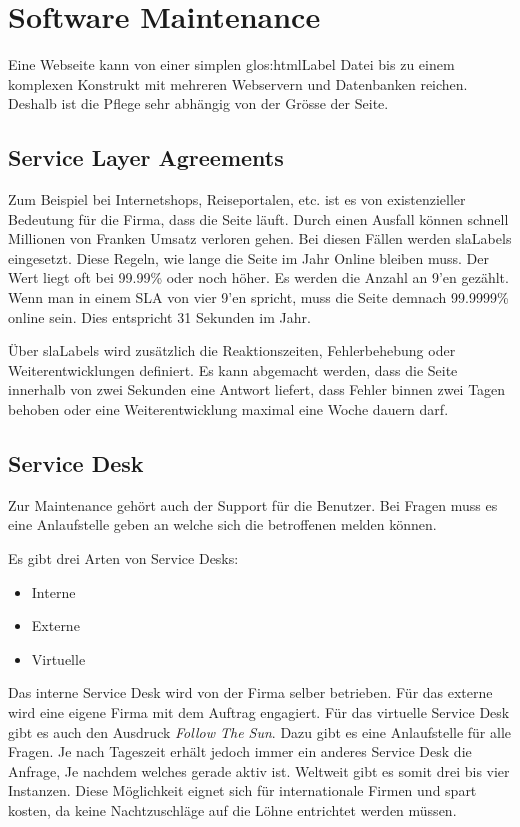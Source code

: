 \chapter{Software Maintenance}
Eine Webseite kann von einer simplen \Gls{glos:htmlLabel} Datei bis zu einem komplexen Konstrukt mit mehreren Webservern und Datenbanken reichen. Deshalb ist die Pflege sehr abhängig von der Grösse der Seite. 

\section{Service Layer Agreements}
Zum Beispiel bei Internetshops, Reiseportalen, etc. ist es von existenzieller Bedeutung für die Firma, dass die Seite läuft. Durch einen Ausfall können schnell Millionen von Franken Umsatz verloren gehen. Bei diesen Fällen werden \glspl{slaLabel} eingesetzt. Diese Regeln, wie lange die Seite im Jahr Online bleiben muss. Der Wert liegt oft bei 99.99\% oder noch höher. Es werden die Anzahl an 9'en gezählt. Wenn man in einem SLA von vier 9’en spricht, muss die Seite demnach 99.9999\% online sein. Dies entspricht 31 Sekunden im Jahr.

Über \glspl{slaLabel} wird zusätzlich die Reaktionszeiten, Fehlerbehebung oder Weiterentwicklungen definiert. Es kann abgemacht werden, dass die Seite innerhalb von zwei Sekunden eine Antwort liefert, dass Fehler binnen zwei Tagen behoben oder eine Weiterentwicklung maximal eine Woche dauern darf.

\section{Service Desk}
Zur Maintenance gehört auch der Support für die Benutzer. Bei Fragen muss es eine Anlaufstelle geben an welche sich die betroffenen melden können.

Es gibt drei Arten von Service Desks:
\begin{itemize}
\item Interne
\item Externe
\item Virtuelle
\end{itemize}

Das interne Service Desk wird von der Firma selber betrieben. Für das externe wird eine eigene Firma mit dem Auftrag engagiert. Für das virtuelle Service Desk gibt es auch den Ausdruck \textit{Follow The Sun}. Dazu gibt es eine Anlaufstelle für alle Fragen. Je nach Tageszeit erhält jedoch immer ein anderes Service Desk die Anfrage, Je nachdem welches gerade aktiv ist. Weltweit gibt es somit drei bis vier Instanzen. Diese Möglichkeit eignet sich für internationale Firmen und spart kosten, da keine Nachtzuschläge auf die Löhne entrichtet werden müssen.